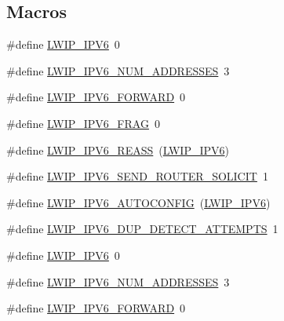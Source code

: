 \subsection*{Macros}
\begin{DoxyCompactItemize}
\item 
\#define \hyperlink{group__lwip__opts__ipv6_ga872e3bb3fe2212156d66b18fccc9643f}{L\+W\+I\+P\+\_\+\+I\+P\+V6}~0
\item 
\#define \hyperlink{group__lwip__opts__ipv6_ga16c1b672604bfb0a66a6aeeb854589d3}{L\+W\+I\+P\+\_\+\+I\+P\+V6\+\_\+\+N\+U\+M\+\_\+\+A\+D\+D\+R\+E\+S\+S\+ES}~3
\item 
\#define \hyperlink{group__lwip__opts__ipv6_gac96c5802de6c75dd62ab38cff6d16a32}{L\+W\+I\+P\+\_\+\+I\+P\+V6\+\_\+\+F\+O\+R\+W\+A\+RD}~0
\item 
\#define \hyperlink{group__lwip__opts__ipv6_ga9ab6269f3087f6d9f7b2c7181ef043c3}{L\+W\+I\+P\+\_\+\+I\+P\+V6\+\_\+\+F\+R\+AG}~0
\item 
\#define \hyperlink{group__lwip__opts__ipv6_gad0ef160d72e63b02c5e875b06ec53864}{L\+W\+I\+P\+\_\+\+I\+P\+V6\+\_\+\+R\+E\+A\+SS}~(\hyperlink{openmote-cc2538_2lwip_2test_2fuzz_2lwipopts_8h_a872e3bb3fe2212156d66b18fccc9643f}{L\+W\+I\+P\+\_\+\+I\+P\+V6})
\item 
\#define \hyperlink{group__lwip__opts__ipv6_ga273ed2e1a4e6a43713a0e4a06a34ee5c}{L\+W\+I\+P\+\_\+\+I\+P\+V6\+\_\+\+S\+E\+N\+D\+\_\+\+R\+O\+U\+T\+E\+R\+\_\+\+S\+O\+L\+I\+C\+IT}~1
\item 
\#define \hyperlink{group__lwip__opts__ipv6_ga580039bf2baf49fcb9e504e5d2b40a03}{L\+W\+I\+P\+\_\+\+I\+P\+V6\+\_\+\+A\+U\+T\+O\+C\+O\+N\+F\+IG}~(\hyperlink{openmote-cc2538_2lwip_2test_2fuzz_2lwipopts_8h_a872e3bb3fe2212156d66b18fccc9643f}{L\+W\+I\+P\+\_\+\+I\+P\+V6})
\item 
\#define \hyperlink{group__lwip__opts__ipv6_gad8489522d34f37e42b4001bab3781bcb}{L\+W\+I\+P\+\_\+\+I\+P\+V6\+\_\+\+D\+U\+P\+\_\+\+D\+E\+T\+E\+C\+T\+\_\+\+A\+T\+T\+E\+M\+P\+TS}~1
\item 
\#define \hyperlink{group__lwip__opts__ipv6_ga872e3bb3fe2212156d66b18fccc9643f}{L\+W\+I\+P\+\_\+\+I\+P\+V6}~0
\item 
\#define \hyperlink{group__lwip__opts__ipv6_ga16c1b672604bfb0a66a6aeeb854589d3}{L\+W\+I\+P\+\_\+\+I\+P\+V6\+\_\+\+N\+U\+M\+\_\+\+A\+D\+D\+R\+E\+S\+S\+ES}~3
\item 
\#define \hyperlink{group__lwip__opts__ipv6_gac96c5802de6c75dd62ab38cff6d16a32}{L\+W\+I\+P\+\_\+\+I\+P\+V6\+\_\+\+F\+O\+R\+W\+A\+RD}~0
\item 

\end{DoxyCompactItemize}
